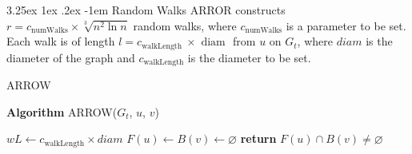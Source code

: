 \documentclass[11pt]{article}
\makeatletter
\renewcommand\paragraph{\@startsection{paragraph}{5}{\z@}%
	{3.25ex \@plus1ex \@minus.2ex}%
	{-1em}%
	{\normalfont\normalsize\bfseries}}
\makeatother
\begin{document}
\paragraph{Random Walks}  {
	ARROR constructs $r=c_{\text{numWalks}} \times \sqrt[3]{n^{2} \ln n}$ random walks, where $c_{\text{numWalks}}$ is a parameter to be set. Each walk is of length $l=c_{\text {walkLength }} \times \text { diam }$ from $u$ on $G_t$, where $diam$ is the diameter of the graph and $c_{\text{walkLength}}$ is the diameter to be set.
}

\begin{algorithm}[H]
	\caption{ARROW}  
	\label{alg:arrow}  
	\textbf{Algorithm} ARROW($G_t$, $u$, $v$)
	
	$wL\leftarrow c_\text{walkLength}\times diam$\;
	$F(u)\leftarrow B(v)\leftarrow \varnothing$\;
	\textbf{return} $F(u)\cap B(v)\neq \varnothing$\;
\end{algorithm}  
\end{document}
